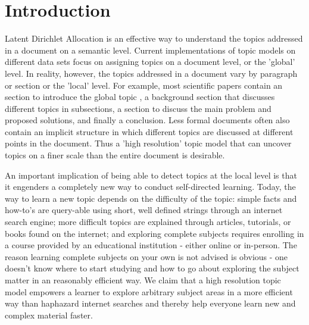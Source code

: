 \documentclass[sigconf]{acmart}
\begin{document}




\maketitle
\section{Introduction}
Latent Dirichlet Allocation is an effective way to understand the topics addressed in a document on a semantic level. Current implementations of topic models on different data sets focus on assigning topics on a document level, or the 'global' level. In reality, however, the topics addressed in a document vary by paragraph or section or the 'local' level. For example, most scientific papers contain an section to introduce the global topic , a background section that discusses different topics in subsections, a section to discuss the main problem and proposed solutions, and finally a conclusion. Less formal documents often also contain an implicit structure in which different topics are discussed at different points in the document. Thus a 'high resolution' topic model that can uncover topics on a finer scale than the entire document is desirable.

An important implication of being able to detect topics at the local level is that it engenders a completely new way to conduct self-directed learning. Today, the way to learn a new topic depends on the difficulty of the topic: simple facts and how-to's are query-able using short, well defined strings through an internet search engine; more difficult topics are explained through articles, tutorials, or books found on the internet; and exploring complete subjects requires enrolling in a course provided by an educational institution - either online or in-person. The reason learning complete subjects on your own is not advised is obvious - one doesn't know where to start studying and how to go about exploring the subject matter in an reasonably efficient way. We claim that a high resolution topic model empowers a learner to explore arbitrary subject areas in a more efficient way than haphazard internet searches and thereby help everyone learn new and complex material faster. 
\end{document}
